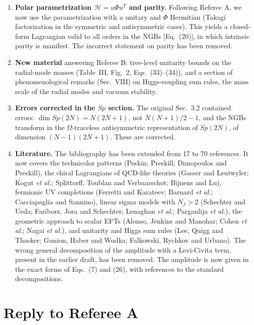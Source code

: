 \documentclass[11pt,a4paper]{article}
\newcommand{\Hf}{\mathcal{H}}
\begin{document}
\begin{enumerate}[leftmargin=*]
\item \textbf{Polar parametrization $\Hf=u\Phi u^T$ and parity.} Following Referee A, we now use the parametrization with $u$ unitary and $\Phi$ Hermitian (Takagi factorization in the symmetric and antisymmetric cases). This yields a closed-form Lagrangian valid to all orders in the NGBs [Eq.~(20)], in which intrinsic parity is manifest. The incorrect statement on parity has been removed.

\item \textbf{New material} answering Referee B: tree-level unitarity bounds on the radial-mode masses (Table~III, Fig.~2, Eqs.~(33)--(34)), and a section of phenomenological remarks (Sec.~VIII) on Higgs-coupling sum rules, the mass scale of the radial modes and vacuum stability.

\item \textbf{Errors corrected in the $Sp$ section.} The original Sec.~3.2 contained errors: $\dim Sp(2N)=N(2N+1)$, not $N(N+1)/2-1$, and the NGBs transform in the $\Omega$-traceless antisymmetric representation of $Sp(2N)$, of dimension $(N-1)(2N+1)$. These are corrected.

\item \textbf{Literature.} The bibliography has been extended from 17 to 70 references. It now covers the technicolor patterns (Peskin; Preskill; Dimopoulos and Preskill), the chiral Lagrangians of QCD-like theories (Gasser and Leutwyler; Kogut \emph{et al.}; Splittorff, Toublan and Verbaarschot; Bijnens and Lu), fermionic UV completions (Ferretti and Karateev; Barnard \emph{et al.}; Cacciapaglia and Sannino), linear sigma models with $N_f>2$ (Schechter and Ueda; Fariborz, Jora and Schechter; Lenaghan \emph{et al.}; Parganlija \emph{et al.}), the geometric approach to scalar EFTs (Alonso, Jenkins and Manohar; Cohen \emph{et al.}; Nagai \emph{et al.}), and unitarity and Higgs sum rules (Lee, Quigg and Thacker; Gunion, Haber and Wudka; Falkowski, Rychkov and Urbano). The wrong general decomposition of the amplitude with a Levi-Civita term, present in the earlier draft, has been removed. The amplitude is now given in the exact forms of Eqs.~(7) and (26), with references to the standard decompositions.
\end{enumerate}

\section*{Reply to Referee A}
\end{document}
